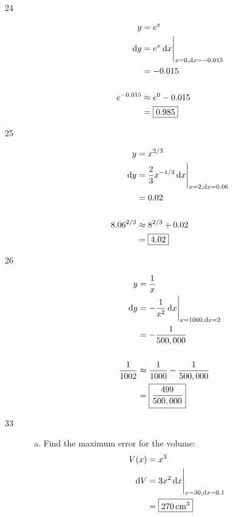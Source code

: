 \documentclass[letterpaper, landscape]{exam}
\newcommand{\dx}{\dif x}
\newcommand{\dy}{\dif y}
\begin{document}
\begin{description}
    \item[24]
      \begin{align*}
        y          & = e^x \\
        \dy        & =  \eval{ e^x \dx }_{x = 0, \dx = -0.015 } \\
                   & = -0.015 \\
        \\
        e^{-0.015} & \approx e^0 - 0.015 \\
                   & = \boxed{ 0.985 } \\
      \end{align*}

    \item[25]
      \begin{align*}
        y          & = x^{2/3} \\
        \dy        & =  \eval{ \frac{2}{3} x^{-1/3} \dx }_{x = 2, \dx = 0.06 } \\
                   & = 0.02 \\
        \\
        8.06^{2/3} & \approx 8^{2/3} + 0.02 \\
                   & = \boxed{ 4.02 } \\
      \end{align*}

    \item[26]
      \begin{align*}
        y              & = \frac{1}{x} \\
        \dy            & =  \eval{ - \frac{1}{x^2} \dx }_{x = 1000, \dx = 2 } \\
                       & = - \frac{1}{500,000} \\
        \\
        \frac{1}{1002} & \approx \frac{1}{1000} - \frac{1}{500,000} \\
                       & = \boxed{ \frac{499}{500,000} }
     \end{align*}

    \newpage

    \item[33]
      \begin{enumerate}[(a)]
        \item 
          Find the maximum error for the volume:
          \begin{align*}
            V(x)   & = x^3 \\
            \dif V & = \eval{ 3x^2 \dx }_{x = 30, \dx = 0.1} \\
                   & = \boxed{ \unit[270]{cm^3} } \\
          \end{align*}


\end{enumerate}
\end{description}
\end{document}

